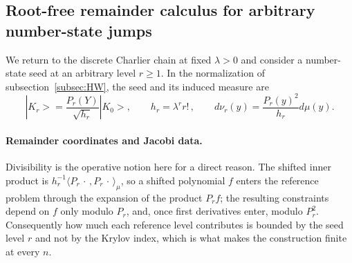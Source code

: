 \documentclass[a4paper,11pt]{article}
\def\ket#1{|#1>}%
\def\dd{d}%
\theoremstyle{definition}
\theoremstyle{remark}
\newcommand{\ket}[1]{|#1\rangle}
\newcommand{\dd}{\mathrm d}
\begin{document}
\subsection{Root-free remainder calculus for arbitrary number-state jumps}
\label{app:H1-general-r}

We return to the discrete Charlier chain at fixed $\lambda>0$ and consider a number-state seed at an arbitrary level $r\ge1$. In the normalization of subsection~\ref{subsec:HW}, the seed and its induced measure are
\begin{equation}
   \ket{K_r}=\frac{P_r(Y)}{\sqrt{h_r}}\ket{K_0},
   \qquad h_r=\lambda^r r!\,,
   \qquad
   \dd\nu_r(y)=\frac{P_r(y)^2}{h_r}\dd\mu(y).
   \label{eq:H1-general-r-seed-app}
\end{equation}
\paragraph{Remainder coordinates and Jacobi data.}
Divisibility is the operative notion here for a direct reason. The shifted inner product
is $h_r^{-1}\langle P_r\,\cdot\,,P_r\,\cdot\,\rangle_\mu$, so a shifted polynomial $f$ enters
the reference problem through the expansion of the product $P_rf$; the resulting
constraints depend on $f$ only modulo $P_r$, and, once first derivatives enter, modulo $P_r^2$.
Consequently how much each reference level contributes is bounded by the seed level $r$ and not by
the Krylov index, which is what makes the construction finite at every $n$.
\end{document}
